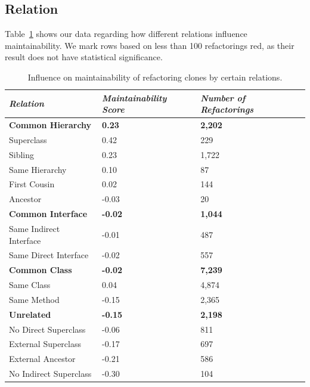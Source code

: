 \subsection{Relation}
Table~\ref{tab:relation_refactor} shows our data regarding how different relations influence maintainability. We mark rows based on less than 100 refactorings red, as their result does not have statistical significance.

\begin{table}[H]
\centering
\begin{tabular}{@{}lll@{}}
\toprule
\textit{\textbf{Relation}} & \textit{\textbf{Maintainability Score}} & \textit{\textbf{Number of Refactorings}} \\ \midrule
\textbf{Common Hierarchy} & \textbf{0.23} & \textbf{2,202} \\ \midrule
\hspace{10pt} Superclass & 0.42 & 229 \\
\hspace{10pt} Sibling & 0.23 & 1,722 \\
\rowcolor[HTML]{FFCCC9}
\hspace{10pt} Same Hierarchy & 0.10 & 87 \\
\hspace{10pt} First Cousin & 0.02 & 144 \\
\rowcolor[HTML]{FFCCC9}
\hspace{10pt} Ancestor & -0.03 & 20 \\ \midrule
\textbf{Common Interface} & \textbf{-0.02} & \textbf{1,044} \\ \midrule
\hspace{10pt} Same Indirect Interface & -0.01 & 487 \\
\hspace{10pt} Same Direct Interface & -0.02 & 557 \\ \midrule
\textbf{Common Class} & \textbf{-0.02} & \textbf{7,239}\\ \midrule
\hspace{10pt} Same Class & 0.04  & 4,874 \\
\hspace{10pt} Same Method & -0.15 & 2,365  \\ \midrule
\textbf{Unrelated} & \textbf{-0.15} & \textbf{2,198}\\ \midrule
\hspace{10pt} No Direct Superclass & -0.06 & 811 \\
\hspace{10pt} External Superclass & -0.17 & 697  \\
\hspace{10pt} External Ancestor & -0.21 & 586  \\
\hspace{10pt} No Indirect Superclass & -0.30 & 104  \\ \midrule
\end{tabular}
\caption{Influence on maintainability of refactoring clones by certain relations.}
\label{tab:relation_refactor}
\end{table}

